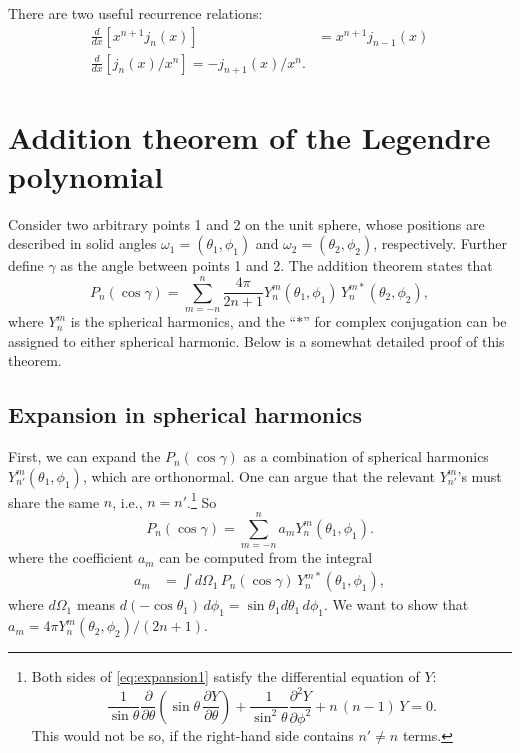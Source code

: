 \documentclass[11pt]{article}
\begin{document}
There are two useful recurrence relations:
\begin{align}
  \frac{d}{dx}
  \left[
    x^{n+1} j_n(x)
  \right]
&=
  x^{n+1} j_{n - 1}(x)
\label{eq:recur_jn1}
  \\
  \frac{d}{dx}
  \left[
    j_n(x) / x^n
  \right]
=
  - j_{n+1}(x) / x^n.
\label{eq:recur_jn2}
\end{align}


\section{Addition theorem of the Legendre polynomial}



Consider two arbitrary points 1 and 2 on the unit sphere,
whose positions are described in solid angles
$\omega_1 = (\theta_1, \phi_1)$
and
$\omega_2 = (\theta_2, \phi_2)$, respectively.
%
Further define $\gamma$ as the angle between points 1 and 2.
%
The addition theorem states that
\begin{equation}
  P_n(\cos\gamma)
= \sum_{m = -n}^n \frac{ 4 \pi } { 2 n + 1 }
  Y_n^m(\theta_1, \phi_1) \, Y_n^{m*}(\theta_2, \phi_2),
\label{eq:addition}
\end{equation}
where $Y_n^m$ is the spherical harmonics,
and the ``$*$'' for complex conjugation
can be assigned to either spherical harmonic.
Below is a somewhat detailed proof of this theorem.



\subsection{Expansion in spherical harmonics}



First, we can expand the $P_n(\cos\gamma)$
as a combination of spherical harmonics $Y_{n'}^m(\theta_1, \phi_1)$,
which are orthonormal.
%
One can argue that the relevant $Y_{n'}^m$'s must share the same $n$,
i.e., $n = n'$.\footnote{
  Both sides of \eqref{eq:expansion1}
  satisfy the differential equation of $Y$:
\[
  \frac{ 1 } { \sin \theta }
  \frac{ \partial } { \partial \theta }
  \left(
    \sin \theta
    \,
    \frac{ \partial Y }{ \partial \theta }
  \right)
  +
  \frac { 1 } { \sin^2 \theta }
  \frac { \partial^2 Y } { \partial \phi^2 }
  + n \, (n - 1)  \, Y = 0.
\]
This would not be so,
if the right-hand side contains $n' \ne n$ terms.
}
%
So
\begin{equation}
  P_n(\cos\gamma)
=
  \sum_{m = -n}^n a_m Y_n^m(\theta_1, \phi_1).
  \label{eq:expansion1}
\end{equation}
%
where the coefficient $a_m$ can be computed from the integral
\begin{align}
  a_m
&=
\int d\Omega_1 \, P_n(\cos\gamma) \, Y_n^{m*}(\theta_1, \phi_1),
\label{eq:am1}
\end{align}
where $d\Omega_1$ means
$d(-\cos\theta_1) \, d\phi_1 = \sin\theta_1 d\theta_1 \, d\phi_1$.
%
We want to show that
$a_m = 4 \pi Y_n^m(\theta_2, \phi_2)/ ( 2 n + 1 )$.
\end{document}
